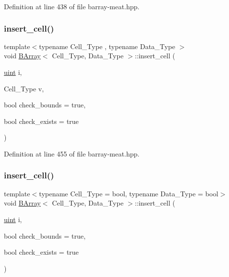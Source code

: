 Definition at line 438 of file barray-\/meat.\+hpp.

\mbox{\label{group__barray-insert_gaeeee5972aa4301465b84dfc431fa6cf9}} 
\subsubsection{\texorpdfstring{insert\+\_\+cell()}{insert\_cell()}\hspace{0.1cm}{\footnotesize\ttfamily [5/6]}}
{\footnotesize\ttfamily template$<$typename Cell\+\_\+\+Type , typename Data\+\_\+\+Type $>$ \\
void \hyperlink{class_b_array}{B\+Array}$<$ Cell\+\_\+\+Type, Data\+\_\+\+Type $>$\+::insert\+\_\+cell (\begin{DoxyParamCaption}\item[{\hyperlink{typedefs_8hpp_a91ad9478d81a7aaf2593e8d9c3d06a14}{uint}}]{i,  }\item[{Cell\+\_\+\+Type}]{v,  }\item[{bool}]{check\+\_\+bounds = {\ttfamily true},  }\item[{bool}]{check\+\_\+exists = {\ttfamily true} }\end{DoxyParamCaption})\hspace{0.3cm}{\ttfamily [inline]}}



Definition at line 455 of file barray-\/meat.\+hpp.

\mbox{\label{group__barray-insert_ga8e930e9e59632684e9526f499bfff0e1}} 
\subsubsection{\texorpdfstring{insert\+\_\+cell()}{insert\_cell()}\hspace{0.1cm}{\footnotesize\ttfamily [6/6]}}
{\footnotesize\ttfamily template$<$typename Cell\+\_\+\+Type = bool, typename Data\+\_\+\+Type = bool$>$ \\
void \hyperlink{class_b_array}{B\+Array}$<$ Cell\+\_\+\+Type, Data\+\_\+\+Type $>$\+::insert\+\_\+cell (\begin{DoxyParamCaption}\item[{\hyperlink{typedefs_8hpp_a91ad9478d81a7aaf2593e8d9c3d06a14}{uint}}]{i,  }\item[{bool}]{check\+\_\+bounds = {\ttfamily true},  }\item[{bool}]{check\+\_\+exists = {\ttfamily true} }\end{DoxyParamCaption})}

